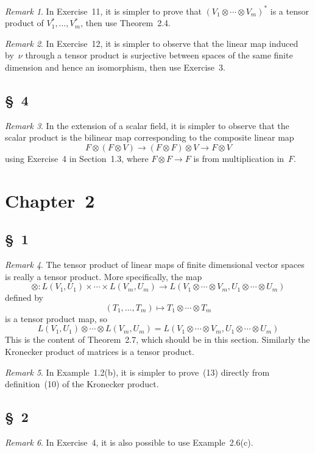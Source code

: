\documentclass[letterpaper,12pt]{article}
\newcommand{\tprod}{\otimes}
\newcommand{\dual}[1]{#1^*}
\newcommand{\multi}[4]{#2_{#3}#1\cdots#1#2_{#4}}
\newcommand{\tprods}[3]{\multi{\tprod}{#1}{#2}{#3}}
\theoremstyle{definition}
\theoremstyle{remark}
\newtheorem*{rmk}{Remark}
\begin{document}
\begin{rmk}
In Exercise~11, it is simpler to prove that \(\dual{(\tprods{V}{1}{m})}\) is a tensor product of \(\dual{V_1},\ldots,\dual{V_m}\), then use Theorem~2.4.
\end{rmk}

\begin{rmk}
In Exercise~12, it is simpler to observe that the linear map induced by~\(\nu\) through a tensor product is surjective between spaces of the same finite dimension and hence an isomorphism, then use Exercise~3.
\end{rmk}

\subsection*{\S~4}
\begin{rmk}
In the extension of a scalar field, it is simpler to observe that the scalar product is the bilinear map corresponding to the composite linear map
\[F\tprod(F\tprod V)\to(F\tprod F)\tprod V\to F\tprod V\]
using Exercise~4 in Section~1.3, where \(F\tprod F\to F\) is from multiplication in~\(F\).
\end{rmk}

\newpage
\section*{Chapter~2}
\subsection*{\S~1}
\begin{rmk}
The tensor product of linear maps of finite dimensional vector spaces is really a tensor product. More specifically, the map
\[\tprod:L(V_1,U_1)\times\cdots\times L(V_m,U_m)\to L(\tprods{V}{1}{m},\tprods{U}{1}{m})\]
defined by
\[(T_1,\ldots,T_m)\mapsto\tprods{T}{1}{m}\]
is a tensor product map, so
\[L(V_1,U_1)\tprod\cdots\tprod L(V_m,U_m)=L(\tprods{V}{1}{m},\tprods{U}{1}{m})\]
This is the content of Theorem~2.7, which should be in this section. Similarly the Kronecker product of matrices is a tensor product.
\end{rmk}

\begin{rmk}
In Example~1.2(b), it is simpler to prove~(13) directly from definition~(10) of the Kronecker product.
\end{rmk}

\subsection*{\S~2}
\begin{rmk}
In Exercise~4, it is also possible to use Example~2.6(c).
\end{rmk}
\end{document}

